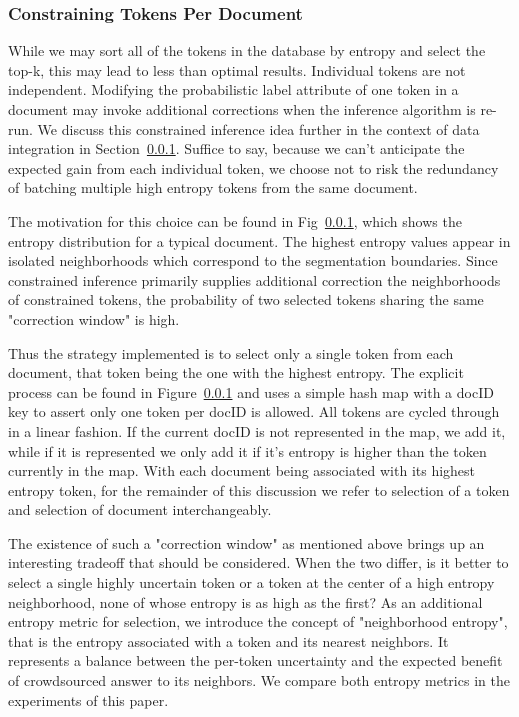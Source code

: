\subsubsection{Constraining Tokens Per Document}
While we may sort all of the tokens in the database by entropy and select the top-k, this may lead to less than optimal results.  Individual tokens are not independent.  Modifying the probabilistic label attribute of one token in a document may invoke additional corrections when the inference algorithm is re-run.  We discuss this constrained inference idea further in the context of data integration in Section~\ref{}.  Suffice to say, because we can't anticipate the expected gain from each individual token, we choose not to risk the redundancy of batching multiple high entropy tokens from the same document.

The motivation for this choice can be found in Fig~\ref{}, which shows the entropy distribution for a typical document.  The highest entropy values appear in isolated neighborhoods which correspond to the segmentation boundaries.  Since constrained inference primarily supplies additional correction the neighborhoods of constrained tokens, the probability of two selected tokens sharing the same "correction window" is high.  

Thus the strategy implemented is to select only a single token from each document, that token being the one with the highest entropy.  The explicit process can be found in Figure~\ref{} and uses a simple hash map with a docID key to assert only one token per docID is allowed.  All tokens are cycled through in a linear fashion.  If the current docID is not represented in the map, we add it, while if it is represented we only add it if it's entropy is higher than the token currently in the map.  With each document being associated with its highest entropy token, for the remainder of this discussion we refer to selection of a token and selection of document interchangeably.

The existence of such a "correction window" as mentioned above brings up an interesting tradeoff that should be considered.  When the two differ, is it better to select a single highly uncertain token or a token at the center of a high entropy neighborhood, none of whose entropy is as high as the first?  As an additional entropy metric for selection, we introduce the concept of "neighborhood entropy", that is the entropy associated with a token and its nearest neighbors.  It represents a balance between the per-token uncertainty and the expected benefit of crowdsourced answer to its neighbors.  We compare both entropy metrics in the experiments of this paper. 

